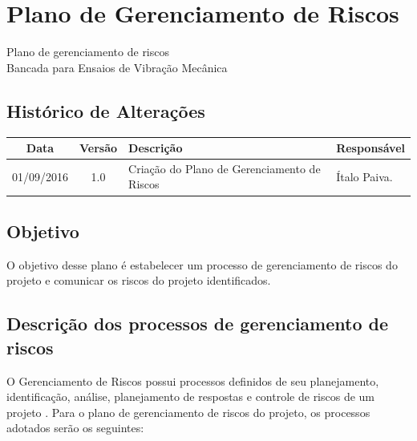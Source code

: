 

\chapter{Plano de Gerenciamento de Riscos}
  	\label{plano_de_riscos}
% 	


\begin{center}
 {\large Plano de gerenciamento de riscos}\\[0.2cm]
 {Bancada para Ensaios de Vibração Mecânica}\\
 \end{center}

 \section*{Histórico de Alterações}
\begin{table}[h]
\centering
\begin{tabular}{|c|c|p{6cm}|p{5cm}|}

Data & Versão & Descrição & Responsável\\
\hline
01/09/2016 & 1.0 & Criação do Plano de Gerenciamento de Riscos & Ítalo Paiva.
\\
\hline
\end{tabular}
\end{table}

\section*{Objetivo}
O objetivo desse plano é estabelecer um processo de gerenciamento de riscos do projeto e comunicar os riscos do projeto identificados.

\section*{Descrição dos processos de gerenciamento de riscos}

O Gerenciamento de Riscos possui processos definidos de seu planejamento, identificação, análise, planejamento de respostas e controle de riscos de um projeto \cite{pmbok}.
Para o plano de gerenciamento de riscos do projeto, os processos adotados serão os seguintes:

